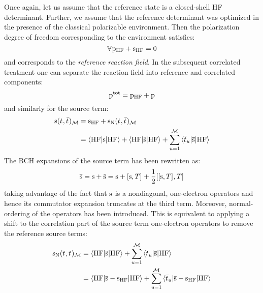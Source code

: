 Once again, let us assume that the reference state is a closed-shell
\acrshort{HF} determinant. Further, we assume that the reference determinant
was optimized in the presence of the classical polarizable environment.
Then the polarization degree of freedom corresponding to the environment
satisfies:
\begin{equation}
  \mathbb{V}\mathrm{p}_\mathrm{HF} + \mathrm{s}_\mathrm{HF} = 0
\end{equation}
and corresponds to the \emph{reference reaction field}.
In the subsequent correlated treatment one can separate the reaction
field into reference and correlated components:
\begin{equation}
  \mathrm{p}^\mathrm{tot} = \mathrm{p}_\mathrm{HF} + \mathrm{p}
\end{equation}
and similarly for the source term:
\begin{equation}
  \begin{aligned}
    \mathrm{s}(t_{}, \bar{t}_{})_\mathcal{M} &= \mathrm{s}_\mathrm{HF} + \mathrm{s}_{\mathrm{N}}(t_{}, \bar{t}_{})_\mathcal{M} \\
                     &=
    \braket{\mathrm{HF} | \mathrm{s} | \mathrm{HF}}
  + \braket{\mathrm{HF} | \tilde{\mathrm{s}} | \mathrm{HF}}
  + \sum_{u=1}^{\mathcal{M}}\braket{\bar{t}_{u} | \overline{\mathrm{s}} | \mathrm{HF}}
  \end{aligned}
\end{equation}
The \acrshort{BCH} expansions of the source term has been rewritten as:
\begin{equation}
  \overline{\mathrm{s}} = \mathrm{s} + \tilde{\mathrm{s}} = \mathrm{s} + [ \mathrm{s}, T ]^{}
  + \frac{1}{2}[ [ \mathrm{s}, T ]^{}, T ]^{}
\end{equation}
taking advantage of the fact that $\mathrm{s}$ is a
nondiagonal, one-electron operators and hence its commutator
expansion truncates at the third term. Moreover, normal-ordering of the
operators has been introduced.\autocite{Crawford2000-ey, Shavitt2009-mr}
This is equivalent to applying a shift to the correlation part of the
source term one-electron operators to remove the reference source terms:
\begin{equation}
  \begin{aligned}
    \mathrm{s}_{\mathrm{N}}(t_{}, \bar{t}_{})_\mathcal{M}
  &=
   \braket{\mathrm{HF} | \tilde{\mathrm{s}} | \mathrm{HF}}
  + \sum_{u=1}^{\mathcal{M}}\braket{\bar{t}_{u} | \overline{\mathrm{s}} | \mathrm{HF}} \\
  &=
    \braket{\mathrm{HF} | \overline{\mathrm{s}} - \mathrm{s}_\mathrm{HF} | \mathrm{HF}}
  + \sum_{u=1}^{\mathcal{M}}\braket{\bar{t}_{u} | \overline{\mathrm{s}} - \mathrm{s}_\mathrm{HF} | \mathrm{HF}}
  \end{aligned}
\end{equation}


